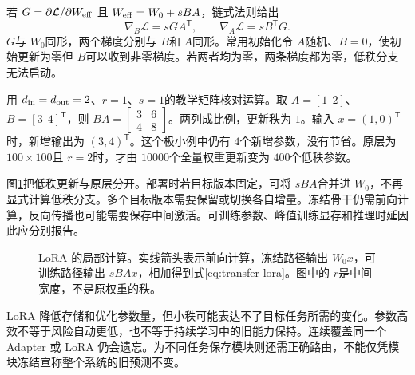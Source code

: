 若 $G=\partial\mathcal L/\partial W_{\rm eff}$ 且 $W_{\rm eff}=W_0+sBA$，链式法则给出
\begin{equation}
\nabla_B\mathcal L=sGA^{\mathsf T},\qquad
\nabla_A\mathcal L=sB^{\mathsf T}G.
\end{equation}
$G$与 $W_0$同形，两个梯度分别与 $B$和 $A$同形。常用初始化令 $A$随机、$B=0$，使初始更新为零但 $B$可以收到非零梯度。若两者均为零，两条梯度都为零，低秩分支无法启动。

用 $d_{\rm in}=d_{\rm out}=2$、$r=1$、$s=1$的教学矩阵核对运算。取 $A=[1\ \ 2]$、$B=[3\ \ 4]^{\mathsf T}$，则 $BA=\begin{bmatrix}3&6\\4&8\end{bmatrix}$。两列成比例，更新秩为 $1$。输入 $x=(1,0)^{\mathsf T}$时，新增输出为 $(3,4)^{\mathsf T}$。这个极小例中仍有 $4$个新增参数，没有节省。原层为 $100\times100$且 $r=2$时，才由 $10000$个全量权重更新变为 $400$个低秩参数。

图\ref{fig:transfer-lora}把低秩更新与原层分开。部署时若目标版本固定，可将 $sBA$合并进 $W_0$，不再显式计算低秩分支。多个目标版本需要保留或切换各自增量。冻结骨干仍需前向计算，反向传播也可能需要保存中间激活。可训练参数、峰值训练显存和推理时延因此应分别报告。
\begin{figure}[htbp]
\centering
{}
\caption{LoRA 的局部计算。实线箭头表示前向计算，冻结路径输出 $W_0x$，可训练路径输出 $sBAx$，相加得到式\eqref{eq:transfer-lora}。图中的 $r$是中间宽度，不是原权重的秩。}
\label{fig:transfer-lora}
\end{figure}

LoRA 降低存储和优化参数量，但小秩可能表达不了目标任务所需的变化。参数高效不等于风险自动更低，也不等于持续学习中的旧能力保持。连续覆盖同一个 Adapter 或 LoRA 仍会遗忘。为不同任务保存模块则还需正确路由，不能仅凭模块冻结宣称整个系统的旧预测不变。

